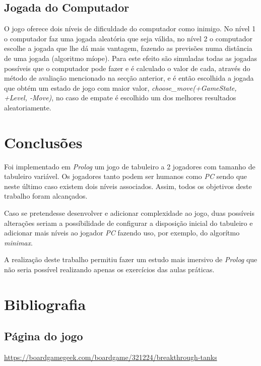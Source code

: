 \documentclass[a4paper,11pt,portuguese]{article}
\begin{document}
    \subsection{Jogada do Computador}

    O jogo oferece dois níveis de dificuldade do computador como inimigo.
    No nível 1 o computador faz uma jogada aleatória que seja válida, no nível 2
    o computador escolhe a jogada que lhe dá mais vantagem, fazendo as previsões
    numa distância de uma jogada (algoritmo míope). Para este efeito são simuladas todas
    as jogadas possíveis que o computador pode fazer e é calculado o valor de cada, através 
    do método de avaliação mencionado na secção anterior, e é então escolhida a jogada que obtém 
    um estado de jogo com maior valor, \textit{choose\_move(+GameState, +Level, -Move)}, no
    caso de empate é escolhido um dos melhores resultados aleatoriamente. 



\section{Conclusões}

Foi implementado em \textit{Prolog} um jogo de tabuleiro a 2 jogadores com tamanho de tabuleiro
variável. Os jogadores tanto podem ser humanos como \textit{PC} sendo que neste último caso
existem dois níveis associados. Assim, todos os objetivos deste trabalho foram alcançados. \par

Caso se pretendesse desenvolver e adicionar complexidade ao jogo, duas possíveis alterações
seriam a possíbilidade de configurar a disposição inicial do tabuleiro e adicionar mais níveis
ao jogador \textit{PC} fazendo uso, por exemplo, do algorítmo \textit{minimax}. \par

A realização deste trabalho permitiu fazer um estudo mais imersivo de \textit{Prolog} que não
seria possível realizando apenas os exercícios das aulas práticas.


\section{Bibliografia}

\subsection{Página do jogo}
\href{https://boardgamegeek.com/boardgame/321224/breakthrough-tanks}{https://boardgamegeek.com/boardgame/321224/breakthrough-tanks}
\end{document}
